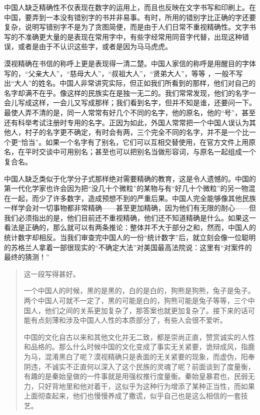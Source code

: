 \documentclass[12pt,oneside]{book}
\begin{document}
\begin{common-format}
中国人缺乏精确性不仅表现在数字的运用上，而且也反映在文字书写和印刷上。在中国，要弄到一本没有错别字的书并非易事。有时，所用的错别字比正确的字还要复杂，说明写错别字不是为了贪图简便，而是由于人们日常不重视精确性。文字书写的不准确更大量的是表现在常用字中，有些字经常用同音字代替，出现这种错误，或者是由于不认识这些字，或者是因为马马虎虎。 

漠视精确在书信的称呼上更是表现得一清二楚。中国人家信的称呼是用醒目的字体写的，“父亲大人”，“慈母大人”，“叔祖大人”，“贤弟大人”，等等 ，一般不写出“大人”的姓名。中国人非常讲究实际，但正如我们所看到的那样，他们对自己的名字却满不在乎。像这样的民族实在是独一无二的。我们常常发现，他们的名字一会儿写成这样，一会儿又写成那样；我们看到名字，但并不知是谁，还要问一下。最使人弄不清的是，同一人常常有好几个不同的名字，他的原名，他的“号”，甚至还有科举考试注册时专用的名字。正因为如此，外国人常常把一个中国人误认为其他人，村子的名字更不确定，有时会有两，三个完全不同的名字，并不是一个比一个更“恰当”。如果一个名字有了别名，它们可以互相交替使用，在官方文件上用原名，在平时交谈中可用别名；甚至也可以把别名当做形容词，与原名一起组成一个复合名。 

中国人缺乏类似于化学分子式那样绝对需要精确的教育，这是令人遗憾的。中国的第一代化学家也许会因为把“没几十个微粒”的某物与有“好几十个微粒”的另一物混在一起，而少了许多数字，造成预想不到的严重后果。中国人完全能够像其他民族一样学会对一切事物都非常精确——甚至更加精确，因为他们有无限的耐心——但我们必须指出的是，他们目前还不重视精确，他们还不知道精确是什么。如果这一看法是正确的，那么就可以有两条推论：整体并不大于部分之和，然而，中国人的统计数字却相反。当我们审查完中国人的一份“统计数字”后，就立刻会像一位聪明的苏格兰人拿着一部很现实的“不确定大法”对美国最高法院说：这里有“对案件的最终的猜测！”

\begin{quotation}
这一段写得甚好。

一个中国人的时候，黑的是黑的，白的是白的，狗熊是狗熊，兔子是兔子。两个中国人可就不一定了，黑的可能是白的，狗熊可能是兔子等等，三个中国人，他们之间的关系更加复杂了，那答案也就更加复杂了。接下来的话可能有点刻薄和涉及中国人人性的本质部分了，有些人会很不爱听。

中国的文化自古以来和其他文化并无二致，都是崇尚正直，赞赏诚实的人性和品格的。那么什么时候中国的文化变成了事实无关紧要，诡辩成风，指鹿为马，混淆黑白了呢？漠视精确只是表面的无关紧要的现象，而虚伪，阳奉阴违，不诚实不正直何以深入了这个民族的灵魂了呢？前面谈到了度量衡，有趣的是秦始皇做的一件事就是用强权推行度量衡。秦始皇暴君也，民弱无力，只好背地里和他对着干，这似乎为这种行为增添了某种正当性，而如果上面彻查起来，他们也慢慢养成了撒谎，似乎自己也是这么相信的一套技艺。


\end{quotation}
\end{common-format}
\end{document}
